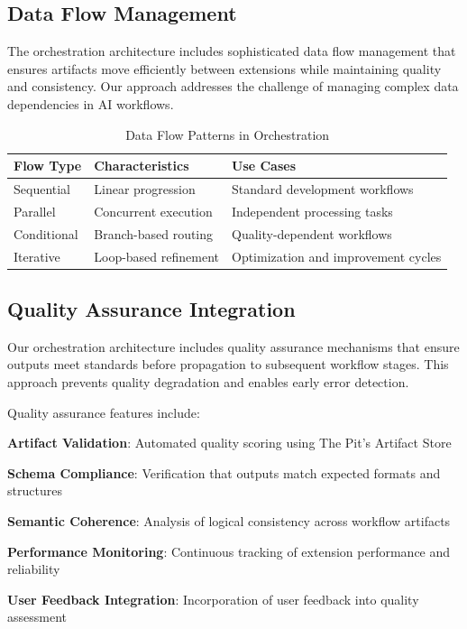 \subsection*{Data Flow Management}

The orchestration architecture includes sophisticated data flow management that ensures artifacts move efficiently between extensions while maintaining quality and consistency. Our approach addresses the challenge of managing complex data dependencies in AI workflows.

\begin{table}[ht]
\centering
\begin{tabular}{@{}lll@{}}
\toprule
\textbf{Flow Type} & \textbf{Characteristics} & \textbf{Use Cases} \\
\midrule
Sequential & Linear progression & Standard development workflows \\
Parallel & Concurrent execution & Independent processing tasks \\
Conditional & Branch-based routing & Quality-dependent workflows \\
Iterative & Loop-based refinement & Optimization and improvement cycles \\
\bottomrule
\end{tabular}
\caption{Data Flow Patterns in Orchestration}
\end{table}

\subsection*{Quality Assurance Integration}

Our orchestration architecture includes quality assurance mechanisms that ensure outputs meet standards before propagation to subsequent workflow stages. This approach prevents quality degradation and enables early error detection.

Quality assurance features include:

\begin{expandedlist}
    \item \textbf{Artifact Validation}: Automated quality scoring using The Pit's Artifact Store
    \item \textbf{Schema Compliance}: Verification that outputs match expected formats and structures
    \item \textbf{Semantic Coherence}: Analysis of logical consistency across workflow artifacts
    \item \textbf{Performance Monitoring}: Continuous tracking of extension performance and reliability
    \item \textbf{User Feedback Integration}: Incorporation of user feedback into quality assessment
\end{expandedlist}


